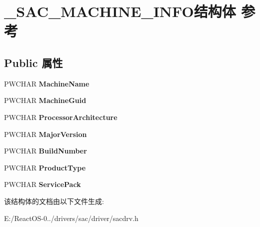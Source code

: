 \hypertarget{struct___s_a_c___m_a_c_h_i_n_e___i_n_f_o}{}\section{\+\_\+\+S\+A\+C\+\_\+\+M\+A\+C\+H\+I\+N\+E\+\_\+\+I\+N\+F\+O结构体 参考}
\label{struct___s_a_c___m_a_c_h_i_n_e___i_n_f_o}
\subsection*{Public 属性}
\begin{DoxyCompactItemize}
\item 
\mbox{\label{struct___s_a_c___m_a_c_h_i_n_e___i_n_f_o_aeb28949fdb6f84eab46c8777b7b92c09}} 
P\+W\+C\+H\+AR {\bfseries Machine\+Name}
\item 
\mbox{\label{struct___s_a_c___m_a_c_h_i_n_e___i_n_f_o_ab5230fe179521c382207db4c921562f3}} 
P\+W\+C\+H\+AR {\bfseries Machine\+Guid}
\item 
\mbox{\label{struct___s_a_c___m_a_c_h_i_n_e___i_n_f_o_ac6f1316fab1f16a11c4a02ad09d7b4be}} 
P\+W\+C\+H\+AR {\bfseries Processor\+Architecture}
\item 
\mbox{\label{struct___s_a_c___m_a_c_h_i_n_e___i_n_f_o_a2c7c69813525dbdc81d841650fffd82c}} 
P\+W\+C\+H\+AR {\bfseries Major\+Version}
\item 
\mbox{\label{struct___s_a_c___m_a_c_h_i_n_e___i_n_f_o_a33a302f14213fec66e9f748eaa644dbd}} 
P\+W\+C\+H\+AR {\bfseries Build\+Number}
\item 
\mbox{\label{struct___s_a_c___m_a_c_h_i_n_e___i_n_f_o_a1df7341d8cf4ed15f13e384f12f3f51e}} 
P\+W\+C\+H\+AR {\bfseries Product\+Type}
\item 
\mbox{\label{struct___s_a_c___m_a_c_h_i_n_e___i_n_f_o_aea5eaab221814aa11f84638f33914f40}} 
P\+W\+C\+H\+AR {\bfseries Service\+Pack}
\end{DoxyCompactItemize}


该结构体的文档由以下文件生成\+:\begin{DoxyCompactItemize}
\item 
E\+:/\+React\+O\+S-\/0../drivers/sac/driver/sacdrv.\+h\end{DoxyCompactItemize}
